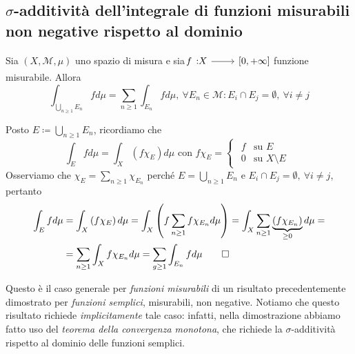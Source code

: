 \subsection{{$\sigma$}-additività dell'integrale di funzioni misurabili non negative rispetto al dominio}
\begin{proposition}
Sia $\left(X,\mathcal{M},\mu\right)$ uno spazio di misura e sia $\funz{f}{X}{\left[0,+\infty\right]}$ funzione misurabile.
Allora
\begin{equation}
	\int_{\bigcup_{n\geq 1}E_n}fd\mu=\sum_{n\geq 1}\int_{E_n}fd\mu,\ \forall E_n\in \mathcal{M}\colon E_i\cap E_j=\emptyset,\ \forall i\neq j
\end{equation}
\end{proposition}
\begin{demonstration}
	Posto $\displaystyle E\coloneqq \bigcup_{n\geq 1}E_n$, ricordiamo che
	\begin{equation*}
		\int_Efd\mu=\int_X\left(f\chi_E\right)d\mu\text{ con }f\chi_E=\begin{cases}
			\begin{array}{ll}
				f&\text{su }E\\
				0&\text{su }X\setminus E
			\end{array}
		\end{cases}
	\end{equation*}
Osserviamo che $\displaystyle \chi_E=\sum_{n\geq 1}\chi_{E_n}$ perché $\displaystyle E=\bigcup_{n\geq 1}E_n$ e $ E_i\cap E_j=\emptyset,\ \forall i\neq j$, pertanto
\begin{align*}
	\int_Efd\mu&=\int_X\left(f\chi_E\right)d\mu=\int_X\left(f\sum_{n\geq 1}f\chi_{E_n}d\mu\right)=\int_X\sum_{n\geq 1}\underbrace{\left(f\chi_{E_n}\right)}_{\geq 0}d\mu=\\
	&=\sum_{n\geq 1}\int_Xf\chi_{E_n}d\mu=\sum_{g\geq 1}\int_{E_n}fd\mu\qedhere
\end{align*}
\end{demonstration}
\begin{observe}
	Questo è il caso generale per \textit{funzioni misurabili} di un risultato precedentemente dimostrato per \textit{funzioni semplici}, misurabili, non negative. Notiamo che questo risultato richiede \textit{implicitamente} tale caso: infatti, nella dimostrazione abbiamo fatto uso del \textit{teorema della convergenza monotona}, che richiede la $\sigma$-additività rispetto al dominio delle funzioni semplici.
\end{observe}
